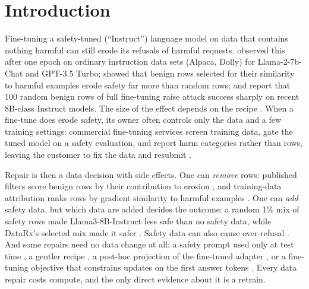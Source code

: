 \documentclass{article}
\theoremstyle{plain}
\theoremstyle{definition}
\theoremstyle{remark}
\begin{document}
\section{Introduction}
\label{sec:intro}

Fine-tuning a safety-tuned (``Instruct'') language model on data that contains
nothing harmful can still erode its refusals of harmful requests.
\citet{qi2024finetuning} observed this after one epoch on ordinary instruction
data sets (Alpaca, Dolly) for Llama-2-7b-Chat and GPT-3.5 Turbo;
\citet{he2024safe} showed that benign rows selected for their similarity to
harmful examples erode safety far more than random rows; and
\citet{guo2026safety} report that 100 random benign rows of full fine-tuning
raise attack success sharply on recent 8B-class Instruct models. The size of
the effect depends on the recipe \citep{kim2025rethinking}. When a fine-tune
does erode safety, its owner often controls only the data and a few training
settings: commercial
fine-tuning services screen training data, gate the tuned model on a safety
evaluation, and report harm categories rather than rows, leaving the customer
to fix the data and resubmit \citep{microsoft2026finetuning}.

Repair is then a data decision with side effects. One can \emph{remove} rows:
published filters score benign rows by their contribution to erosion
\citep{he2024safe,guan2025benign,li2025larf,wang2026sqsd,zhang2026datashield},
and training-data attribution ranks rows by gradient similarity to harmful
examples \citep{jiao2025datelm,pan2026detecting}. One can \emph{add} safety
data, but which data are added decides the outcome: a random 1\% mix of safety
rows made Llama3-8B-Instruct less safe than no safety data, while DataRx's
selected mix made it safer \citep{zhang2026datarx}. Safety data can also cause
over-refusal \citep{bianchi2024safety,luo2026reweighting}. And some repairs
need no data change at all: a safety prompt used only at test time
\citep{lyu2024keeping}, a gentler recipe \citep{kim2025rethinking}, a post-hoc
projection of the fine-tuned adapter \citep{hsu2024safelora}, or a fine-tuning
objective that constrains updates on the first answer tokens
\citep{qi2025shallow}. Every data repair costs compute, and the only direct
evidence about it is a retrain.
\end{document}
